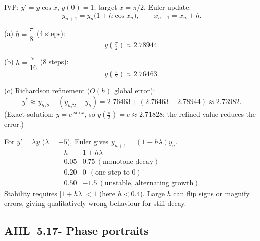 \documentclass[11pt]{article}
\def\textbf#1{#1}%
\newcommand{\tocsubsection}[1]{\subsection{#1}}
\begin{document}
\begin{solution}
IVP: $y'=y\cos x$, $y(0)=1$; target $x=\pi/2$. Euler update:
\[
y_{n+1}=y_n\big(1+h\cos x_n\big),\qquad x_{n+1}=x_n+h.
\]

\textbf{(a)} $h=\dfrac{\pi}{8}$ (4 steps):
\[
y(\tfrac{\pi}{2})\approx \boxed{2.78944}.
\]

\textbf{(b)} $h=\dfrac{\pi}{16}$ (8 steps):
\[
y(\tfrac{\pi}{2})\approx \boxed{2.76463}.
\]

\textbf{(c)} Richardson refinement ($O(h)$ global error):
\[
y^\ast \approx y_{h/2}+(y_{h/2}-y_h)
= 2.76463+(2.76463-2.78944)
\approx \boxed{2.73982}.
\]
(Exact solution: $y=e^{\sin x}$, so $y(\tfrac{\pi}{2})=e\approx 2.71828$; the refined value reduces the error.)
\end{solution}

\begin{solution}
For $y'=\lambda y$ ($\lambda=-5$), Euler gives $y_{n+1}=(1+h\lambda)y_n$.
\[
\begin{array}{c|c}
h & 1+h\lambda \\ \hline
0.05 & 0.75 \ (\text{monotone decay})\\
0.20 & 0 \ \ (\text{one step to }0)\\
0.50 & -1.5 \ (\text{unstable, alternating growth})
\end{array}
\]
Stability requires $|1+h\lambda|<1$ (here $h<0.4$). Large $h$ can flip signs or magnify errors, giving qualitatively wrong behaviour for stiff decay.
\end{solution}








\tocsubsection{AHL 5.17- Phase portraits}

\end{document}
